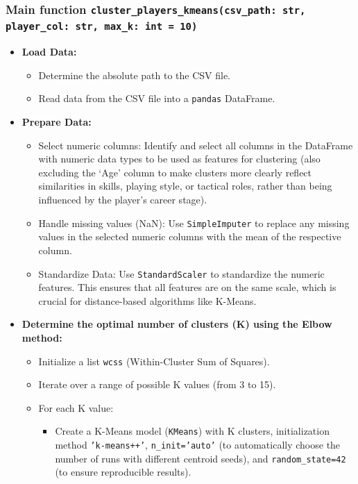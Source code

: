 \documentclass[12pt, a4paper]{report}
\begin{document}
\subsubsection*{Main function \texttt{cluster\_players\_kmeans(csv\_path: str, player\_col: str, max\_k: int = 10)}}
\begin{itemize}
    \item \textbf{Load Data:}
    \begin{itemize}
        \item Determine the absolute path to the CSV file.
        \item Read data from the CSV file into a \texttt{pandas} DataFrame.
    \end{itemize}
    \item \textbf{Prepare Data:}
    \begin{itemize}
        \item Select numeric columns: Identify and select all columns in the DataFrame with numeric data types to be used as features for clustering (also excluding the ‘Age’ column to make clusters more clearly reflect similarities in skills, playing style, or tactical roles, rather than being influenced by the player's career stage).
        \item Handle missing values (NaN): Use \texttt{SimpleImputer} to replace any missing values in the selected numeric columns with the mean of the respective column.
        \item Standardize Data: Use \texttt{StandardScaler} to standardize the numeric features. This ensures that all features are on the same scale, which is crucial for distance-based algorithms like K-Means.
    \end{itemize}
    \item \textbf{Determine the optimal number of clusters (K) using the Elbow method:}
    \begin{itemize}
        \item Initialize a list \texttt{wcss} (Within-Cluster Sum of Squares).
        \item Iterate over a range of possible K values (from 3 to 15).
        \item For each K value:
        \begin{itemize}
            \item Create a K-Means model (\texttt{KMeans}) with K clusters, initialization method \texttt{'k-means++'}, \texttt{n\_init='auto'} (to automatically choose the number of runs with different centroid seeds), and \texttt{random\_state=42} (to ensure reproducible results).

\end{itemize}
\end{itemize}
\end{itemize}
\end{document}
